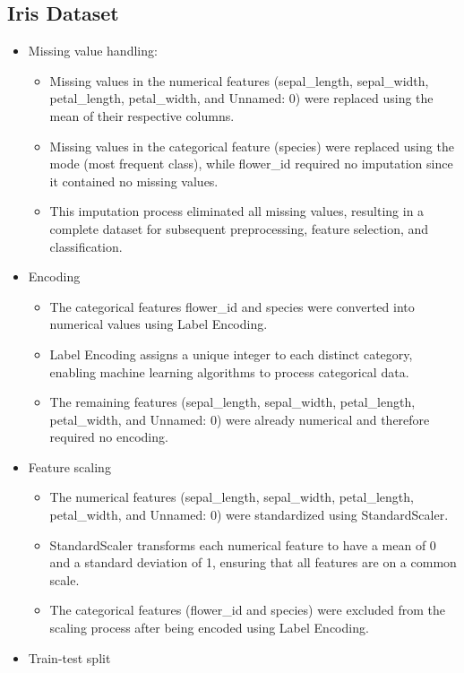 \documentclass[12pt,a4paper]{article}
\begin{document}
\subsection*{Iris Dataset}
\begin{itemize}
\item Missing value handling:
\begin{itemize}
\item Missing values in the numerical features (sepal\_length, sepal\_width, petal\_length, petal\_width, and Unnamed: 0) were replaced using the mean of their respective columns.
\item Missing values in the categorical feature (species) were replaced using the mode (most frequent class), while flower\_id required no imputation since it contained no missing values.
\item This imputation process eliminated all missing values, resulting in a complete dataset for subsequent preprocessing, feature selection, and classification.
\end{itemize}
\item Encoding
\begin{itemize}
\item The categorical features flower\_id and species were converted into numerical values using Label Encoding.
\item Label Encoding assigns a unique integer to each distinct category, enabling machine learning algorithms to process categorical data.
\item The remaining features (sepal\_length, sepal\_width, petal\_length, petal\_width, and Unnamed: 0) were already numerical and therefore required no encoding.
\end{itemize}
\item Feature scaling
\begin{itemize}
\item The numerical features (sepal\_length, sepal\_width, petal\_length, petal\_width, and Unnamed: 0) were standardized using StandardScaler.
\item StandardScaler transforms each numerical feature to have a mean of 0 and a standard deviation of 1, ensuring that all features are on a common scale.
\item The categorical features (flower\_id and species) were excluded from the scaling process after being encoded using Label Encoding.
\end{itemize}
\item Train-test split
\begin{itemize}

\end{itemize}
\end{itemize}
\end{document}
